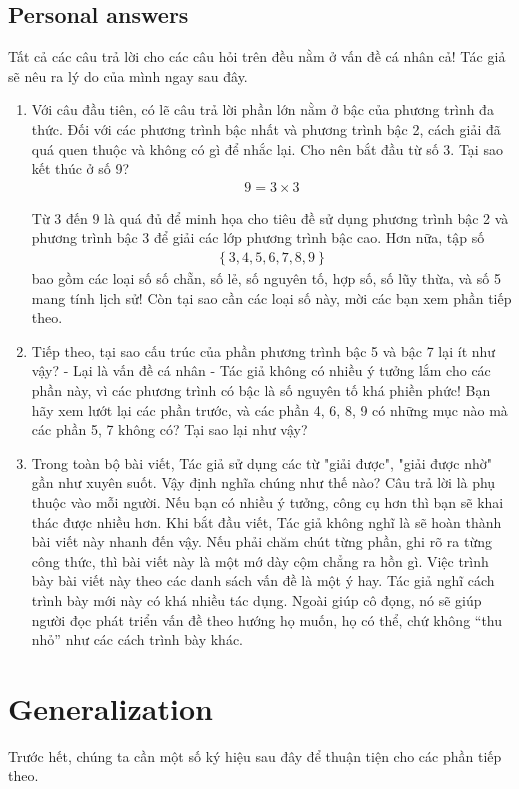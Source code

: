 \documentclass[a4paper,oneside]{book}
\numberwithin{equation}{chapter}
\begin{document}
\section{Personal answers}
Tất cả các câu trả lời cho các câu hỏi trên đều nằm ở vấn đề cá nhân cả! Tác giả sẽ nêu ra lý do của mình ngay sau đây.
\begin{enumerate}
\item Với câu đầu tiên, có lẽ câu trả lời phần lớn nằm ở bậc của phương trình đa thức. Đối với các phương trình bậc nhất và phương trình bậc 2, cách giải đã quá quen thuộc và không có gì để nhắc lại. Cho nên bắt đầu từ số 3. Tại sao kết thúc ở số 9? 
\begin{align}
9=3 \times 3
\end{align}

Từ 3 đến 9 là quá đủ để minh họa cho tiêu đề sử dụng phương trình bậc 2 và phương trình bậc 3 để giải các lớp phương trình bậc cao. Hơn nữa, tập số 
\begin{align}
\left\{ {3,4,5,6,7,8,9} \right\}
\end{align}
bao gồm các loại số số chẵn, số lẻ, số nguyên tố, hợp số, số lũy thừa, và số 5 mang tính lịch sử! Còn tại sao cần các loại số này, mời các bạn xem phần tiếp theo.
\item Tiếp theo, tại sao cấu trúc của phần phương trình bậc 5 và bậc 7 lại ít như vậy? - Lại là vấn đề cá nhân - Tác giả không có nhiều ý tưởng lắm cho các phần này, vì các phương trình có bậc là số nguyên tố khá phiền phức! Bạn hãy xem lướt lại các phần trước, và các phần 4, 6, 8, 9 có những mục nào mà các phần 5, 7 không có? Tại sao lại như vậy?
\item Trong toàn bộ bài viết, Tác giả sử dụng các từ "giải được", "giải được nhờ" gần như xuyên suốt. Vậy định nghĩa chúng như thế nào? Câu trả lời là phụ thuộc vào mỗi người. Nếu bạn có nhiều ý tưởng, công cụ hơn thì bạn sẽ khai thác được nhiều hơn. Khi bắt đầu viết, Tác giả không nghĩ là sẽ hoàn thành bài viết này nhanh đến vậy. Nếu phải chăm chút từng phần, ghi rõ ra từng công thức, thì bài viết này là một mớ dày cộm chẳng ra hồn gì. Việc trình bày bài viết này theo các danh sách vấn đề là một ý hay. Tác giả nghĩ cách trình bày mới này có khá nhiều tác dụng. Ngoài giúp cô đọng, nó sẽ giúp người đọc phát triển vấn đề theo hướng họ muốn, họ có thể, chứ không ``thu nhỏ'' như các cách trình bày khác.
\end{enumerate}
\chapter{Generalization}
Trước hết, chúng ta cần một số ký hiệu sau đây để thuận tiện cho các phần tiếp theo.
\end{document}
